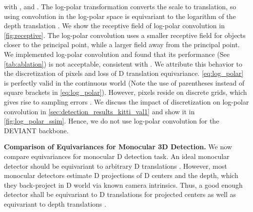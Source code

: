 \documentclass[runningheads]{llncs}
\newcommand{\twoD}{D}
\newcommand{\threeD}{D}
\newcommand{\equivariant} {equivariant}
\newcommand{\equivariance}{equivariance}
\newcommand{\Equivariance}{Equivariance}
\newcommand{\logPolar}{log-polar}
\newcommand{\noIndentHeading}[1]{\noindent\textbf{#1}}
\newcommand{\methodName}{DEVIANT}
\begin{document}
            with , and .
            The \logPolar{} transformation converts the scale to translation, so using convolution in the \logPolar{} space is \equivariant{} to the logarithm of the depth translation .
            We show the receptive field of \logPolar{} convolution in \cref{fig:receptive}.
            The \logPolar{} convolution uses a smaller receptive field for objects closer to the principal point, while a larger field away from the principal point.
            We implemented \logPolar{} convolution and found that its performance (See \cref{tab:ablation}) is not acceptable, consistent with \cite{sosnovik2020sesn}.
            We attribute this behavior to the discretization of pixels and loss of \twoD{} translation \equivariance.
            \cref{eq:log_polar} is perfectly valid in the continuous world (Note the use of parentheses instead of square brackets in \cref{eq:log_polar}). 
            However, pixels reside on discrete grids, which gives rise to sampling errors \cite{kumar2013estimation}.
            We discuss the impact of discretization on \logPolar{} convolution in \cref{sec:detection_results_kitti_val1} and show it in \cref{fig:log_polar_ssim}. 
            Hence, we do not use \logPolar{} convolution for the \methodName{} backbone.


\noIndentHeading{Comparison of \Equivariance s for Monocular 3D Detection.}
            We now compare \equivariance{}s for monocular \threeD{} detection task.
            An ideal monocular detector should be \equivariant{} to arbitrary \threeD{} translations .
            However, most monocular detectors \cite{kumar2021groomed, lu2021geometry}  estimate \twoD{} projections of \threeD{} centers and the depth, which they back-project in \threeD{} world via known camera intrinsics. 
            Thus, a good enough detector shall be \equivariant{} to \twoD{} translations  for projected centers as well as \equivariant{} to depth translations . 
            
\end{document}
